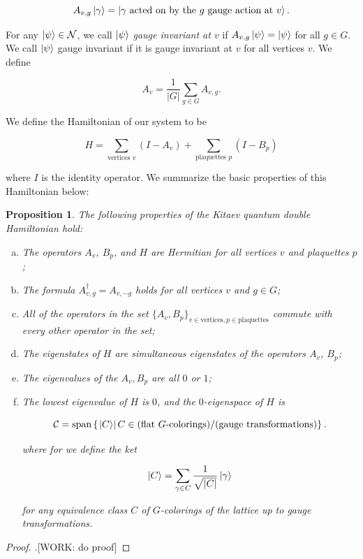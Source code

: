 \documentclass{article}
\newtheorem{proposition}{Proposition}[section]
\theoremstyle{definition}
\numberwithin{figure}{section}
\begin{document}
$$A_{v,g}\ket{\gamma}=\ket{\gamma \text{ acted on by the $g$ gauge action at $v$}}.$$

For any $\ket{\psi}\in \mathcal{N}$, we call $\ket{\psi}$ \textit{gauge invariant at $v$} if $A_{v,g}\ket{\psi}=\ket{\psi}$ for all $g\in G$. We call $\ket{\psi}$ gauge invariant if it is gauge invariant at $v$ for all vertices $v$. We define

$$A_v=\frac{1}{|G|}\sum_{g\in G}A_{v,g}.$$

We define the Hamiltonian of our system to be

$$H=\sum_{\text{vertices $v$}}(I-A_v)+\sum_{\text{plaquettes $p$}}(I-B_p)$$

where $I$ is the identity operator. We summarize the basic properties of this Hamiltonian below:

\begin{proposition} The following properties of the Kitaev quantum double Hamiltonian hold:

\begin{enumerate}[(a)]
\item The operators $A_v$, $B_p$, and $H$ are Hermitian for all vertices $v$ and plaquettes $p$;
\item The formula $A_{v,g}^{\dagger}=A_{v,-g}$ holds for all vertices $v$ and $g\in G$;
\item All of the operators in the set $\{A_v,B_p\}_{v\in \text{vertices}, p\in \text{plaquettes}}$ commute with every other operator in the set;
\item The eigenstates of $H$ are simultaneous eigenstates of the operators $A_v$, $B_p$;
\item The eigenvalues of the $A_v,B_p$ are all $0$ or $1$;
\item The lowest eigenvalue of $H$ is $0$, and the $0$-eigenspace of $H$ is

$$\mathcal{C}=\text{span}\left\{\left.\ket{C}\right| C\in \text{(flat $G$-colorings)}/\text{(gauge transformations)}\right\}.$$

where for we define the ket

$$\ket{C}=\sum_{\gamma \in C}\frac{1}{\sqrt{|C|}}\ket{\gamma}$$

for any equivalence class $C$ of $G$-colorings of the lattice up to gauge transformations.

\end{enumerate}
\end{proposition}
\begin{proof}.[WORK: do proof]
\end{proof}
\end{document}
